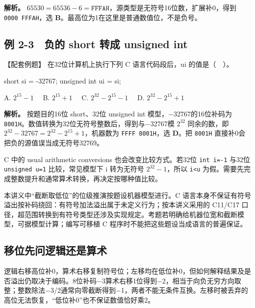 \textbf{解析。} \(65530=65536-6=\mathtt{FFFAH}\)，源类型是无符号16位数，扩展补0，得到 \texttt{0000 FFFAH}，选 \textbf{B}。最高位为1在这里是普通数值位，不是负号。

\subsection{例 2-3　负的 short 转成 unsigned int}\label{CO02-07}

\begin{example}[配套例题]

【配套例题】 在32位计算机上执行下列 C 语言代码段后，ui 的值是（　）。

\begin{codeblock}[language=C]
short si = -32767;
unsigned int ui = si;
\end{codeblock}

A. \(2^{15}-1\)　 B. \(2^{15}+1\)　 C. \(2^{32}-2^{15}-1\)　 D. \(2^{32}-2^{15}+1\)

\end{example}

\textbf{解析。} 按题目的16位 short、32位 unsigned int 模型，\ensuremath{-}32767的16位补码为 \texttt{8001H}。数值转换为32位无符号整数后，得到与\ensuremath{-}32767模 \(2^{32}\) 同余的数，即 \(2^{32}-32767=2^{32}-2^{15}+1\)，机器数为 \texttt{FFFF 8001H}，选 \textbf{D}。把 \texttt{8001H} 直接补0会把负的源值误当成无符号32769。

C 中的 usual arithmetic conversions 也会改变比较方式。若32位 \texttt{int i=\allowbreak{}-1} 与32位 \texttt{unsigned u=\allowbreak{}1} 比较，常见模型下 i 转为无符号 \(2^{32}-1\)，所以 \texttt{i<\allowbreak{}u} 为假。需要先完成整数提升和通常算术转换，再决定按哪种值比较。

本讲义中``截断取低位''的位级推演按题设机器模型进行。C 语言本身不保证有符号溢出按补码绕回：有符号加法溢出属于未定义行为；按本讲义采用的 C11/C17 口径，超范围转换到有符号类型还涉及实现规定。考题若明确给机器位宽和截断模型，可据模型计算；编写可移植 C 程序时不能把这些题设当成语言的普遍保证。

\subsection{移位先问逻辑还是算术}\label{CO02-08}

逻辑右移高位补0，算术右移复制符号位；左移均在低位补0，但如何解释结果及是否溢出仍取决于编码。8位补码\ensuremath{-}3算术右移1位得到\ensuremath{-}2，相当于向负无穷方向取整；整数除法\ensuremath{-}3/2通常向零截断得到\ensuremath{-}1，两者不能无条件互换。左移时被丢弃的高位无法恢复，``低位补0''也不保证数值恰好乘2。

